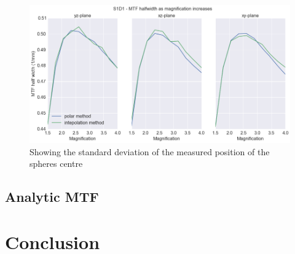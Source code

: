 \documentclass[
  twoside,
  11pt, a4paper,
  footinclude=true,
  headinclude=true,
  cleardoublepage=empty
]{scrbook}
\begin{document}
\begin{figure}[h!]
  \centering
    \includegraphics[width=\textwidth]{figures/S1D1half.png}
    \caption{Showing the standard deviation of the measured position of the spheres centre}
        \label{S1D1half}
\end{figure}





\section{Analytic MTF}


\chapter{Conclusion}
\end{document}
